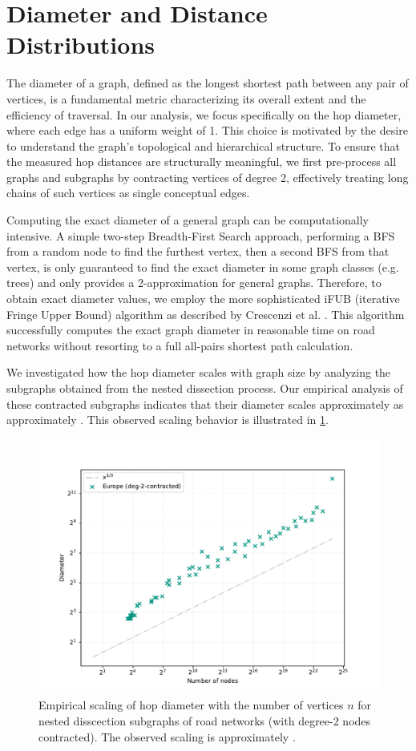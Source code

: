 \section{Diameter and Distance Distributions}
\label{sec:diameter}

The diameter of a graph, defined as the longest shortest path between any pair of vertices, is a fundamental metric characterizing its overall extent and the efficiency of traversal.
In our analysis, we focus specifically on the hop diameter, where each edge has a uniform weight of 1.
This choice is motivated by the desire to understand the graph's topological and hierarchical structure.
To ensure that the measured hop distances are structurally meaningful, we first pre-process all graphs and subgraphs by contracting vertices of degree 2, effectively treating long chains of such vertices as single conceptual edges.

Computing the exact diameter of a general graph can be computationally intensive.
A simple two-step Breadth-First Search approach, performing a BFS from a random node to find the furthest vertex, then a second BFS from that vertex, is only guaranteed to find the exact diameter in some graph classes (e.g. trees) and only provides a 2-approximation for general graphs.
Therefore, to obtain exact diameter values, we employ the more sophisticated iFUB (iterative Fringe Upper Bound) algorithm as described by Crescenzi et al. \cite{crescenzi_computing_2013}.
This algorithm successfully computes the exact graph diameter in reasonable time on road networks without resorting to a full all-pairs shortest path calculation.

We investigated how the hop diameter scales with graph size by analyzing the subgraphs obtained from the nested dissection process.
Our empirical analysis of these contracted subgraphs indicates that their diameter scales approximately as approximately .
This observed scaling behavior is illustrated in \cref{fig:road_network_diameter_scaling}.

\begin{figure}[tbhp]
	\centering
	\includegraphics[width=0.7\linewidth]{graphics/diam-europe-ifub.pdf}
	\caption{Empirical scaling of hop diameter with the number of vertices \(n\) for nested disscection subgraphs of road networks (with degree-2 nodes contracted). The observed scaling is approximately .}
	\label{fig:road_network_diameter_scaling}
\end{figure}


